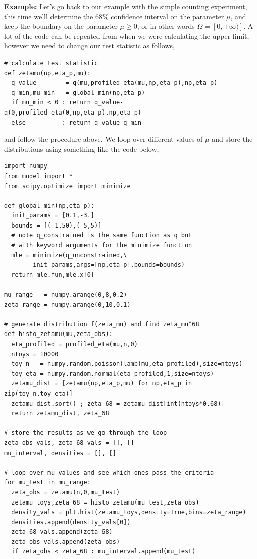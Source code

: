 \begin{tcolorbox}[colback=backblue]
\textbf{Example:} Let's go back to our example with the simple counting experiment, this time we'll determine the 68\% confidence interval on the parameter $\mu$, and keep the boundary on the parameter $\mu\geq0$, or in other words $\Omega = [0,+\infty)]$. A lot of the code can be repeated from when we were calculating the upper limit, however we need to change our test statistic as follows,
\begin{lstlisting}[style = Python]
# calculate test statistic
def zetamu(np,eta_p,mu):
  q_value        = q(mu,profiled_eta(mu,np,eta_p),np,eta_p)
  q_min,mu_min   = global_min(np,eta_p)
  if mu_min < 0 : return q_value-q(0,profiled_eta(0,np,eta_p),np,eta_p)
  else          : return q_value-q_min
\end{lstlisting}
and follow the procedure above. We loop over different values of $\mu$ and store the distributions using something like the code below, 
\begin{lstlisting}[style = Python]
import numpy
from model import *
from scipy.optimize import minimize
  
def global_min(np,eta_p):
  init_params = [0.1,-3.]
  bounds = [(-1,50),(-5,5)]
  # note q_constrained is the same function as q but 
  # with keyword arguments for the minimize function
  mle = minimize(q_unconstrained,\
        init_params,args=[np,eta_p],bounds=bounds)
  return mle.fun,mle.x[0]
  
mu_range   = numpy.arange(0,8,0.2)
zeta_range = numpy.arange(0,10,0.1)

# generate distribution f(zeta_mu) and find zeta_mu^68
def histo_zetamu(mu,zeta_obs):
  eta_profiled = profiled_eta(mu,n,0)
  ntoys = 10000
  toy_n   = numpy.random.poisson(lamb(mu,eta_profiled),size=ntoys)
  toy_eta = numpy.random.normal(eta_profiled,1,size=ntoys)
  zetamu_dist = [zetamu(np,eta_p,mu) for np,eta_p in zip(toy_n,toy_eta)]
  zetamu_dist.sort() ; zeta_68 = zetamu_dist[int(ntoys*0.68)]
  return zetamu_dist, zeta_68
 
# store the results as we go through the loop
zeta_obs_vals, zeta_68_vals = [], []
mu_interval, densities = [], []

# loop over mu values and see which ones pass the criteria
for mu_test in mu_range:
  zeta_obs = zetamu(n,0,mu_test)
  zetamu_toys,zeta_68 = histo_zetamu(mu_test,zeta_obs)
  density_vals = plt.hist(zetamu_toys,density=True,bins=zeta_range)
  densities.append(density_vals[0])
  zeta_68_vals.append(zeta_68)
  zeta_obs_vals.append(zeta_obs)
  if zeta_obs < zeta_68 : mu_interval.append(mu_test)
\end{lstlisting}


\end{tcolorbox}

